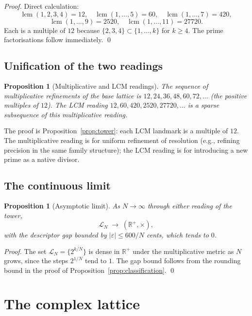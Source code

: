 \documentclass[11pt,a4paper]{article}
\newtheorem{proposition}[theorem]{Proposition}
\theoremstyle{definition}
\theoremstyle{remark}
\newcommand{\R}{\mathbb{R}}
\DeclareMathOperator{\lcm}{lcm}
\newcommand{\eps}{\varepsilon}
\begin{document}
\begin{proof}
Direct calculation:
\[
\lcm(1,2,3,4)=12,\quad \lcm(1,\ldots,5)=60,\quad \lcm(1,\ldots,7)=420,
\]
\[
\lcm(1,\ldots,9)=2520,\quad \lcm(1,\ldots,11)=27720.
\]
Each is a multiple of $12$ because $\{2,3,4\}\subset\{1,\ldots,k\}$ for $k\ge 4$. The prime factorisations follow immediately. \qed
\end{proof}

\subsection{Unification of the two readings}

\begin{proposition}[Multiplicative and LCM readings]\label{prop:unification}
The sequence of multiplicative refinements of the base lattice is $12,24,36,48,60,72,\ldots$ (the positive multiples of $12$). The LCM reading $12,60,420,2520,27720,\ldots$ is a sparse subsequence of this multiplicative reading.
\end{proposition}

The proof is Proposition~\ref{prop:tower}: each LCM landmark is a multiple of $12$. The multiplicative reading is for uniform refinement of resolution (e.g., refining precision in the same family structure); the LCM reading is for introducing a new prime as a native divisor.

\subsection{The continuous limit}

\begin{proposition}[Asymptotic limit]\label{prop:limit}
As $N\to\infty$ through either reading of the tower,
\[
\mathcal{L}_{N} \;\longrightarrow\; (\R^{+},\times),
\]
with the descriptor gap bounded by $|\eps|\le 600/N$ cents, which tends to $0$.
\end{proposition}

\begin{proof}
The set $\mathcal{L}_{N}=\{2^{k/N}\}$ is dense in $\R^{+}$ under the multiplicative metric as $N$ grows, since the steps $2^{1/N}$ tend to $1$. The gap bound follows from the rounding bound in the proof of Proposition~\ref{prop:classification}. \qed
\end{proof}

\section{The complex lattice}\label{sec:complex}
\end{document}

